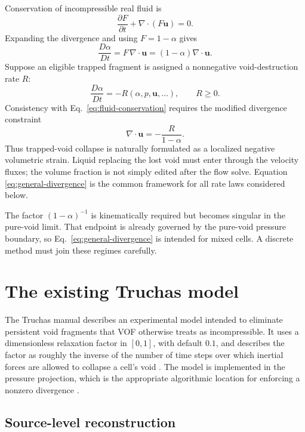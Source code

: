 \documentclass[11pt]{article}
\newcommand{\divg}{\nabla\!\cdot}
\newcommand{\uv}{\boldsymbol{u}}
\begin{document}
Conservation of incompressible real fluid is
\begin{equation}
  \frac{\partial F}{\partial t}+\divg(F\uv)=0.
  \label{eq:fluid-conservation}
\end{equation}
Expanding the divergence and using \(F=1-\alpha\) gives
\begin{equation}
  \frac{D\alpha}{Dt}=F\,\divg\uv=(1-\alpha)\divg\uv.
  \label{eq:kinematic-identity}
\end{equation}
Suppose an eligible trapped fragment is assigned a nonnegative void-destruction rate
\(R\):
\begin{equation}
  \frac{D\alpha}{Dt}=-R(\alpha,p,\uv,\ldots), \qquad R\geq 0.
\end{equation}
Consistency with Eq.~\eqref{eq:fluid-conservation} requires the modified divergence
constraint
\begin{equation}
  \boxed{\divg\uv=-\frac{R}{1-\alpha}.}
  \label{eq:general-divergence}
\end{equation}
Thus trapped-void collapse is naturally formulated as a localized negative volumetric
strain.  Liquid replacing the lost void must enter through the velocity fluxes; the
volume fraction is not simply edited after the flow solve.  Equation
\eqref{eq:general-divergence} is the common framework for all rate laws considered below.

The factor \((1-\alpha)^{-1}\) is kinematically required but becomes singular in the
pure-void limit.  That endpoint is already governed by the pure-void pressure boundary,
so Eq.~\eqref{eq:general-divergence} is intended for mixed cells.  A discrete method must
join these regimes carefully.

\section{The existing Truchas model}

The Truchas manual describes an experimental model intended to eliminate persistent
void fragments that VOF otherwise treats as incompressible.  It uses a dimensionless
relaxation factor in \([0,1]\), with default \(0.1\), and describes the factor as roughly
the inverse of the number of time steps over which inertial forces are allowed to
collapse a cell's void \cite{truchas-manual}.  The model is implemented in the pressure
projection, which is the appropriate algorithmic location for enforcing a nonzero
divergence \cite{bell-colella-glaz1989}.

\subsection{Source-level reconstruction}
\end{document}
